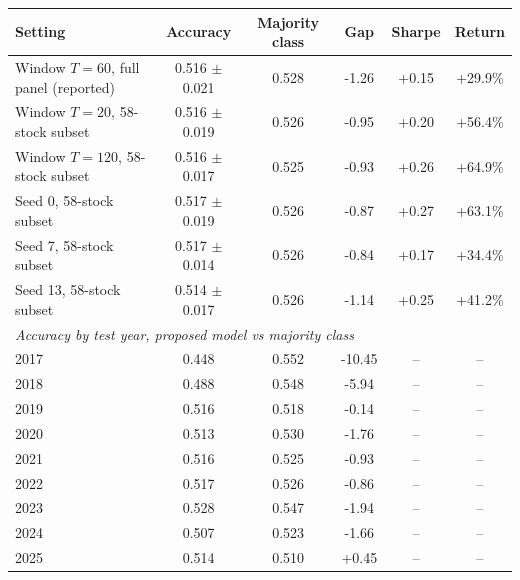 {\footnotesize
\setlength{\tabcolsep}{3pt}
\begin{tabular}{lccccc}
\toprule
\textbf{Setting} & \textbf{Accuracy} & \textbf{Majority class} & \textbf{Gap} & \textbf{Sharpe} & \textbf{Return} \\
\midrule
Window $T=60$, full panel (reported) & 0.516 $\pm$ 0.021 & 0.528 & -1.26 & +0.15 & +29.9\% \\
Window $T=20$, 58-stock subset & 0.516 $\pm$ 0.019 & 0.526 & -0.95 & +0.20 & +56.4\% \\
Window $T=120$, 58-stock subset & 0.516 $\pm$ 0.017 & 0.525 & -0.93 & +0.26 & +64.9\% \\
Seed 0, 58-stock subset & 0.517 $\pm$ 0.019 & 0.526 & -0.87 & +0.27 & +63.1\% \\
Seed 7, 58-stock subset & 0.517 $\pm$ 0.014 & 0.526 & -0.84 & +0.17 & +34.4\% \\
Seed 13, 58-stock subset & 0.514 $\pm$ 0.017 & 0.526 & -1.14 & +0.25 & +41.2\% \\
\midrule
\multicolumn{6}{l}{\emph{Accuracy by test year, proposed model vs majority class}} \\
  2017 & 0.448 & 0.552 & -10.45 & -- & -- \\
  2018 & 0.488 & 0.548 & -5.94 & -- & -- \\
  2019 & 0.516 & 0.518 & -0.14 & -- & -- \\
  2020 & 0.513 & 0.530 & -1.76 & -- & -- \\
  2021 & 0.516 & 0.525 & -0.93 & -- & -- \\
  2022 & 0.517 & 0.526 & -0.86 & -- & -- \\
  2023 & 0.528 & 0.547 & -1.94 & -- & -- \\
  2024 & 0.507 & 0.523 & -1.66 & -- & -- \\
  2025 & 0.514 & 0.510 & +0.45 & -- & -- \\
\bottomrule
\end{tabular}
}
